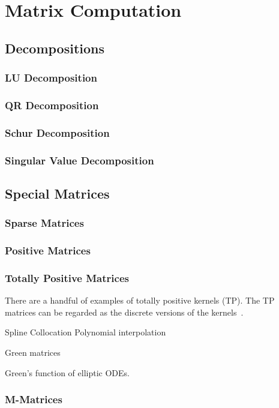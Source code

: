 \chapter{Matrix Computation}
\label{Ch: 8-Mat-Com}
\section{Decompositions}
\subsection{LU Decomposition}
\subsection{QR Decomposition}
\subsection{Schur Decomposition}
\subsection{Singular Value Decomposition}
\section{Special Matrices}
\subsection{Sparse Matrices}
\subsection{Positive Matrices}
\subsection{Totally Positive Matrices} 
    There are a handful of examples of totally positive kernels (TP). The TP matrices can be regarded as the discrete versions of the kernels~\cite{karlin1970total}. 
    \begin{example}
        Spline Collocation
Polynomial interpolation
    \end{example}
    \begin{example}
        Green matrices
    \end{example}
\begin{example}
    Green's function of elliptic ODEs. 
\end{example}
\subsection{M-Matrices}
